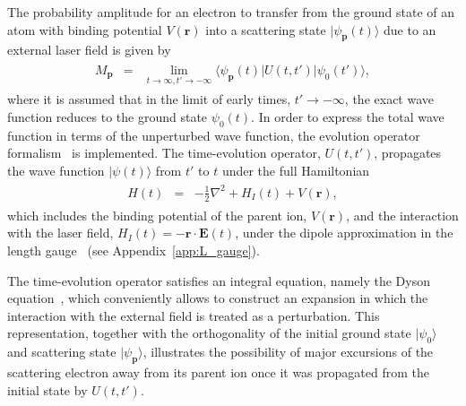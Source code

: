 The probability amplitude for an electron to transfer from the ground
state of an atom with binding potential $V(\mathbf{r})$ into a
scattering state $|\psi_{\mathbf{p}}(t)\rangle$ due to an external
laser field is given by~\cite{Kopold_1997sfa}
\begin{eqnarray}
\label{eq:matrix_element}
\begin{split}
M_{\mathbf{p}} & = & \lim_{t\to\infty,t'\to -\infty}
{\langle \psi_{\mathbf{p}}(t) | U(t,t') | \psi_{0}(t') \rangle},
\end{split}
\end{eqnarray}
where it is assumed that in the limit of early times, $t'\to -\infty$,
the exact wave function reduces to the ground state $\psi_{0}(t)$. In
order to express the total wave function in terms of the unperturbed
wave function, the evolution operator formalism~\cite{BeckerTEOp_2006}
is implemented. The time-evolution operator, $U(t,t')$, propagates the
wave function $|\psi(t)\rangle$ from $t'$ to $t$ under the full
Hamiltonian
%
\begin{eqnarray}
\label{eq:H_ati}
\begin{split}
H(t) & = & -\frac{1}{2} \nabla^{2} + H_{I}(t) + V(\mathbf{r}),
\end{split}
\end{eqnarray}
%
which includes the binding potential of the parent ion,
$V(\mathbf{r})$, and the interaction with the laser field,
$H_{I}(t)=-\mathbf{r}\cdot\mathbf{E}(t)$, under the dipole
approximation in the length gauge~\cite{Kopold_1997sfa} (see
Appendix~\ref{app:L_gauge}).

The time-evolution operator satisfies an integral equation, namely the
Dyson equation~\cite{Kopold_1997sfa, cjp2010_keldysh}, which
conveniently allows to construct an expansion in which the interaction
with the external field is treated as a perturbation. This
representation, together with the orthogonality of the initial ground
state $|\psi_{0}\rangle$ and scattering state
$|\psi_{\mathbf{p}}\rangle$, illustrates the possibility of major
excursions of the scattering electron away from its parent ion once it
was propagated from the initial state by $U(t,t')$.

